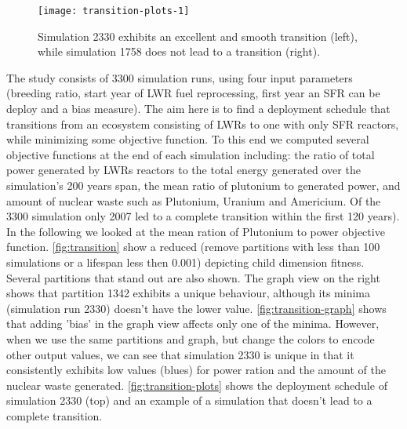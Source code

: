\begin{figure}[tb]
    \begin{center}
     \texttt{[image: transition-plots-1]}
    \caption{Simulation 2330 exhibits an excellent and smooth transition (left), while simulation 1758 does not lead to a transition (right).}
    \label{fig:transition-plots}
    \end{center}
\end{figure}

The study consists of 3300 simulation runs, using four input parameters (breeding ratio, start year of LWR fuel reprocessing, first year an SFR can be deploy and a bias measure). The aim here is to find a deployment schedule that transitions from an ecosystem consisting of LWRs to one with only SFR reactors, while minimizing some objective function. To this end we computed several objective functions at the end of each simulation including: the ratio of total power generated by LWRs reactors to the total energy generated over the simulation's 200 years span, the mean ratio of plutonium to generated power, and amount of nuclear waste such as Plutonium, Uranium and Americium. 
Of the 3300 simulation only 2007 led to a complete transition within the first 120 years). In the following we looked at the mean ration of Plutonium to power objective function. \autoref{fig:transition} show a reduced \RT (remove partitions with less than 100 simulations or a lifespan less then 0.001) depicting child dimension fitness. Several partitions that stand out are also shown. The graph view on the right shows that partition 1342 exhibits a unique behaviour, although its minima (simulation run 2330) doesn't have the lower value. \autoref{fig:transition-graph} shows that adding 'bias' in the graph view affects only one of the minima. However, when we use the same partitions and graph, but change the colors to encode other output values, we can see that simulation 2330 is unique in that it consistently exhibits low values (blues) for power ration and the amount of the nuclear waste generated. \autoref{fig:transition-plots} shows the deployment schedule of simulation 2330 (top) and an example of a simulation that doesn't lead to a complete transition. 
 


